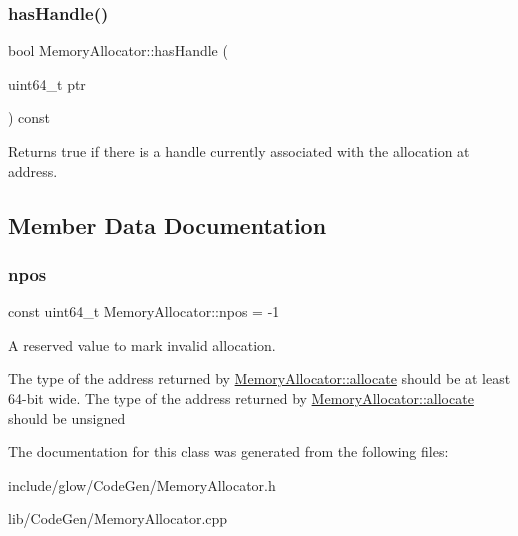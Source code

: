 \subsubsection{\texorpdfstring{has\+Handle()}{hasHandle()}}
{\footnotesize\ttfamily bool Memory\+Allocator\+::has\+Handle (\begin{DoxyParamCaption}\item[{uint64\+\_\+t}]{ptr }\end{DoxyParamCaption}) const}

\begin{DoxyReturn}{Returns}
true if there is a handle currently associated with the allocation at {\ttfamily address}. 
\end{DoxyReturn}


\subsection{Member Data Documentation}
\mbox{\label{classglow_1_1_memory_allocator_a41dc4f17fc3b4e242406d9d4a9b419d5}} 
\subsubsection{\texorpdfstring{npos}{npos}}
{\footnotesize\ttfamily const uint64\+\_\+t Memory\+Allocator\+::npos = -\/1\hspace{0.3cm}{\ttfamily [static]}}



A reserved value to mark invalid allocation. 

The type of the address returned by \hyperlink{classglow_1_1_memory_allocator_a8bd7c15304cb54909cbba8878ea57f7b}{Memory\+Allocator\+::allocate} should be at least 64-\/bit wide. The type of the address returned by \hyperlink{classglow_1_1_memory_allocator_a8bd7c15304cb54909cbba8878ea57f7b}{Memory\+Allocator\+::allocate} should be unsigned 

The documentation for this class was generated from the following files\+:\begin{DoxyCompactItemize}
\item 
include/glow/\+Code\+Gen/Memory\+Allocator.\+h\item 
lib/\+Code\+Gen/Memory\+Allocator.\+cpp\end{DoxyCompactItemize}
